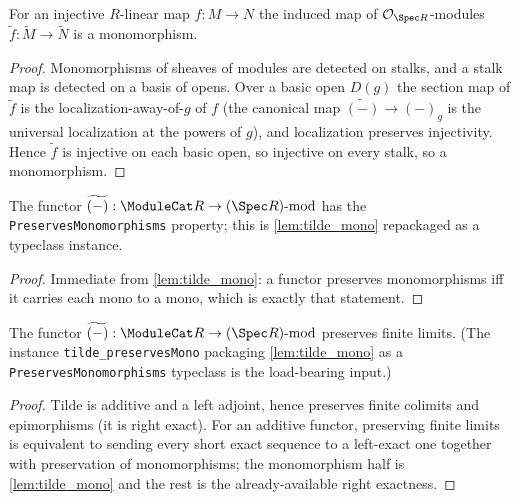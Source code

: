 \begin{lemma}
  \label{lem:tilde_mono}
  For an injective $R$-linear map $f : M \to N$ the induced map of
  $\mathcal{O}_{\Spec R}$-modules $\widetilde f : \widetilde M \to \widetilde N$
  is a monomorphism.
  \begin{proof}
    Monomorphisms of sheaves of modules are detected on stalks, and a stalk map
    is detected on a basis of opens. Over a basic open $D(g)$ the section map of
    $\widetilde f$ is the localization-away-of-$g$ of $f$ (the canonical map
    $\widetilde{(-)} \to (-)_g$ is the universal localization at the powers of
    $g$), and localization preserves injectivity. Hence $\widetilde f$ is
    injective on each basic open, so injective on every stalk, so a monomorphism.
  \end{proof}
\end{lemma}

\begin{lemma}
  \label{lem:tilde_preservesMono}
  The functor $\widetilde{(-)} : \ModuleCat R \to (\Spec R)\text{-mod}$ has the
  \texttt{PreservesMonomorphisms} property; this is \cref{lem:tilde_mono}
  repackaged as a typeclass instance.
  \begin{proof}
    Immediate from \cref{lem:tilde_mono}: a functor preserves monomorphisms iff it
    carries each mono to a mono, which is exactly that statement.
  \end{proof}
\end{lemma}

\begin{lemma}
  \label{lem:tilde_preservesFiniteLimits}
  The functor $\widetilde{(-)} : \ModuleCat R \to (\Spec R)\text{-mod}$ preserves
  finite limits. (The instance \texttt{tilde\_preservesMono} packaging
  \cref{lem:tilde_mono} as a \texttt{PreservesMonomorphisms} typeclass is the
  load-bearing input.)
  \begin{proof}
    Tilde is additive and a left adjoint, hence preserves finite colimits and
    epimorphisms (it is right exact). For an additive functor, preserving finite
    limits is equivalent to sending every short exact sequence to a left-exact one
    together with preservation of monomorphisms; the monomorphism half is
    \cref{lem:tilde_mono} and the rest is the already-available right exactness.
  \end{proof}
\end{lemma}


